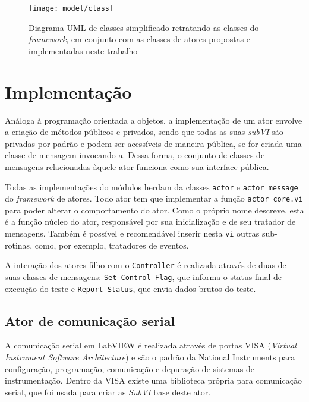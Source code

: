             \begin{figure}
                \centering
                \texttt{[image: model/class]}
                \caption{Diagrama UML de classes simplificado retratando as classes do \textit{framework}, em conjunto com as classes de atores propostas e implementadas neste trabalho}
                \label{fig:classdiagram}
            \end{figure}
            
 
    \section{Implementação}
        
        Análoga à programação orientada a objetos, a implementação de um ator envolve a criação de métodos públicos e privados, sendo que todas as suas \textit{subVI} são privadas por padrão e podem ser acessíveis de maneira pública, se for criada uma classe de mensagem invocando-a. Dessa forma, o conjunto de classes de mensagens relacionadas àquele ator funciona como sua interface pública.
        
        Todas as implementações do módulos herdam da classes \texttt{actor} e \texttt{actor message} do \textit{framework} de atores. Todo ator tem que implementar a função \texttt{actor core.vi} para poder alterar o comportamento do ator. Como o próprio nome descreve, esta é a função núcleo do ator, responsável por sua inicialização e de seu tratador de mensagens. Também é possível e recomendável inserir nesta \texttt{vi} outras sub-rotinas, como, por exemplo, tratadores de eventos.    
        
        A interação dos atores filho com o \texttt{Controller} é realizada através de duas de suas classes de mensagens: \texttt{Set Control Flag}, que informa o status final de execução do teste e \texttt{Report Status}, que envia dados brutos do teste.
        
            
        \subsection{Ator de comunicação serial}
        \label{modcom}
        
            A comunicação serial em LabVIEW é realizada através de portas VISA (\textit{Virtual Instrument Software Architecture}) e são o padrão da National Instruments para configuração, programação, comunicação e depuração de sistemas de instrumentação. Dentro da VISA existe uma biblioteca própria para comunicação serial, que foi usada para criar as \textit{SubVI} base deste ator.
            
